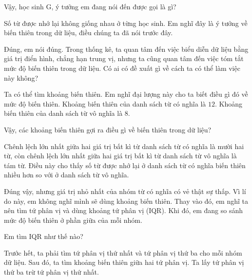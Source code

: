 {\begin{scriptlist}
      \item [Giáo viên:] Vậy, học sinh G, ý tưởng em đang nói đến được gọi là gì?
      
      \item [Học sinh G:] Số từ được nhớ lại không giống nhau ở từng học sinh. Em nghĩ đây là ý tưởng về biến thiên trong dữ liệu, điều chúng ta đã nói trước đây.
      
      \item [Giáo viên:] Đúng, em nói đúng. Trong thống kê, ta quan tâm đến việc biểu diễn dữ liệu bằng giá trị điển hình, chẳng hạn trung vị, nhưng ta cũng quan tâm đến việc tóm tắt mức độ biến thiên trong dữ liệu. Có ai có đề xuất gì về cách ta có thể làm việc này không?
      
      \item [Học sinh H:] Ta có thể tìm khoảng biến thiên. Em nghĩ đại lượng này cho ta biết điều gì đó về mức độ biến thiên. Khoảng biến thiên của danh sách từ có nghĩa là $12$. Khoảng biến thiên của danh sách từ vô nghĩa là $8$.
      
      \item [Giáo viên:] Vậy, các khoảng biến thiên gợi ra điều gì về biến thiên trong dữ liệu?
      
      \item [Học sinh H:] Chênh lệch lớn nhất giữa hai giá trị bất kì từ danh sách từ có nghĩa là mười hai từ, còn chênh lệch lớn nhất giữa hai giá trị bất kì từ danh sách từ vô nghĩa là tám từ. Điều này cho thấy số từ được nhớ lại ở danh sách từ có nghĩa biến thiên nhiều hơn so với ở danh sách từ vô nghĩa.\vspace{\baselineskip}
      
      \item [Học sinh I:] Đúng vậy, nhưng giá trị nhỏ nhất của nhóm từ có nghĩa có vẻ thật sự thấp. Vì lí do này, em không nghĩ mình sẽ dùng khoảng biến thiên. Thay vào đó, em nghĩ ta nên tìm tứ phân vị và dùng khoảng tứ phân vị (IQR). Khi đó, em đang so sánh mức độ biến thiên ở phần giữa của mỗi nhóm.\vspace{\baselineskip}
      
      \item [Giáo viên:] Em tìm IQR như thế nào?
      
      \item [Học sinh I:] Trước hết, ta phải tìm tứ phân vị thứ nhất và tứ phân vị thứ ba cho mỗi nhóm dữ liệu. Sau đó, ta tìm khoảng biến thiên giữa hai tứ phân vị. Ta lấy tứ phân vị thứ ba trừ tứ phân vị thứ nhất.
      

\end{scriptlist}}

